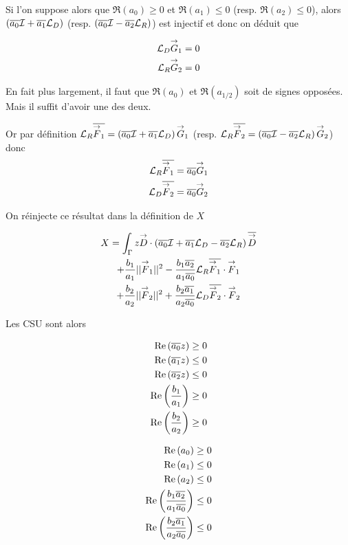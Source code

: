   Si l'on suppose alors que \(\Re(a_0) \ge 0 \) et \(\Re(a_1) \le 0\) (resp. \(\Re(a_2)\le0\)), alors \(\left(\conj{a_0} \oI + \conj{a_1} \LD \right)\) (resp. \(\left(\conj{a_0} \oI - \conj{a_2} \LR \right)\)) est injectif et donc on déduit que

  \begin{align}
    \LD\vG_1 = 0
    \\
    \LR\vG_2 = 0
  \end{align}

\begin{TODO}
  En fait plus largement, il faut que \(\Re(a_0)\) et \(\Re(a_{1/2})\) soit de signes opposées. Mais il suffit d'avoir une des deux.
\end{TODO}

  Or par définition \(\LR\conj{\vF_1} = \left(\conj{a_0} \oI + \conj{a_1} \LD \right)\vG_1\) (resp. \(\LR\conj{\vF_2} = \left(\conj{a_0} \oI - \conj{a_2} \LR \right)\vG_2\)) donc
  \begin{align}
    \LR\conj{\vF_1} &= \conj{a_0}\vG_1
    \\
    \LD\conj{\vF_2} &= \conj{a_0}\vG_2
  \end{align}

  On réinjecte ce résultat dans la définition de \(X\)

  \begin{multline}
    X = \int_\Gamma z \vD \cdot \left(\conj{a_0} \oI + \conj{a_1} \LD - \conj{a_2}\LR\right)\conj{\vD}
    \\
    + \frac{b_1}{a_1} ||\vF_1||^2 - \frac{b_1\conj{a_2}}{a_1\conj{a_0}} \LR\conj{\vF_1}\cdot\vF_1
    \\
    + \frac{b_2}{a_2} ||\vF_2||^2 + \frac{b_2\conj{a_1}}{a_2\conj{a_0}} \LD\conj{\vF_2}\cdot\vF_2
  \end{multline}

  Les CSU sont alors

  \begin{minipage}{0.5\textwidth}
  \begin{align}
    \Re\left(\conj{a_0}z\right) \ge 0
    \\
    \Re\left(\conj{a_1}z\right) \le 0
    \\
    \Re\left(\conj{a_2}z\right) \le 0
    \\
    \Re\left(\frac{b_1}{a_1}\right) \ge 0
    \\
    \Re\left(\frac{b_2}{a_2}\right) \ge 0
  \end{align}
  \end{minipage}
  \begin{minipage}{0.49\textwidth}
  \begin{align}
    \Re\left(a_0\right) \ge 0
    \\
    \Re\left(a_1\right) \le 0
    \\
    \Re\left(a_2\right) \le 0
    \\
    \Re\left(\frac{b_1\conj{a_2}}{a_1\conj{a_0}}\right) \le 0
    \\
    \Re\left(\frac{b_2\conj{a_1}}{a_2\conj{a_0}}\right) \le 0
  \end{align}
  \end{minipage}